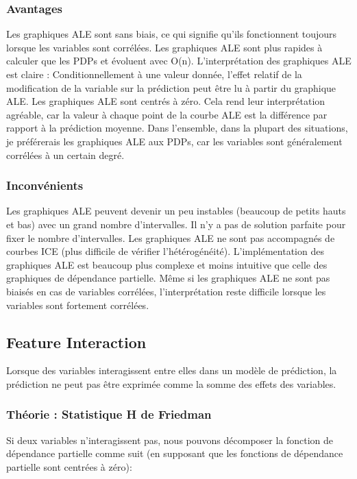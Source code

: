 \subsubsection{Avantages}

Les graphiques ALE sont sans biais, ce qui signifie qu'ils fonctionnent toujours lorsque les variables sont corrélées.
Les graphiques ALE sont plus rapides à calculer que les PDPs et évoluent avec O(n).
L'interprétation des graphiques ALE est claire : Conditionnellement à une valeur donnée, l'effet relatif de la modification de la variable sur la prédiction peut être lu à partir du graphique ALE. Les graphiques ALE sont centrés à zéro. Cela rend leur interprétation agréable, car la valeur à chaque point de la courbe ALE est la différence par rapport à la prédiction moyenne.
Dans l'ensemble, dans la plupart des situations, je préférerais les graphiques ALE aux PDPs, car les variables sont généralement corrélées à un certain degré.

\subsubsection{Inconvénients}

Les graphiques ALE peuvent devenir un peu instables (beaucoup de petits hauts et bas) avec un grand nombre d'intervalles.
Il n'y a pas de solution parfaite pour fixer le nombre d'intervalles.
Les graphiques ALE ne sont pas accompagnés de courbes ICE (plus difficile de vérifier l'hétérogénéité).
L'implémentation des graphiques ALE est beaucoup plus complexe et moins intuitive que celle des graphiques de dépendance partielle.
Même si les graphiques ALE ne sont pas biaisés en cas de variables corrélées, l'interprétation reste difficile lorsque les variables sont fortement corrélées.

\subsection{Feature Interaction}

Lorsque des variables interagissent entre elles dans un modèle de prédiction, la prédiction ne peut pas être exprimée comme la somme des effets des variables. 

\subsubsection{Théorie : Statistique H de Friedman}
Si deux variables n'interagissent pas, nous pouvons décomposer la fonction de dépendance partielle comme suit (en supposant que les fonctions de dépendance partielle sont centrées à zéro):

